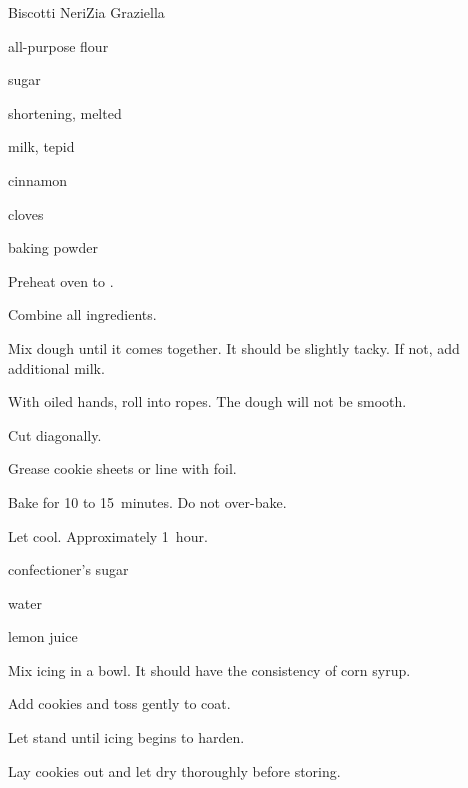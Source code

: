 \begin{recipe}{Biscotti Neri}{Zia Graziella}{}

\begin{ingredients}
\item {} all-purpose flour
\item {} sugar
\item \lbs{\half} shortening, melted
\item {} milk, tepid
\item {} 
\item {} cinnamon
\item {} cloves
\item {} baking powder
\end{ingredients}

\begin{directions}
\item Preheat oven to .
\item Combine all ingredients.
\item Mix dough until it comes together. It should be slightly tacky. If not, add additional milk.
\item With oiled hands, roll into ropes. The dough will not be smooth.
\item Cut diagonally.
\item Grease cookie sheets or line with foil.
\item Bake for 10 to 15~minutes. Do not over-bake.
\item Let cool. Approximately 1~hour.
\end{directions}


\begin{ingredients}
\item confectioner's sugar
\item water
\item lemon juice
\end{ingredients}

\begin{directions}
\item Mix icing in a bowl. It should have the consistency of corn syrup.
\item Add cookies and toss gently to coat.
\item Let stand until icing begins to harden.
\item Lay cookies out and let dry thoroughly before storing.
\end{directions}

\end{recipe}
